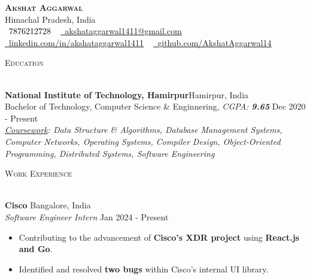 \documentclass[a4paper]{article}
\newcommand{\bulletSep} { \vspace{2mm} }
\newcommand{\sectionSep} { \vspace{3mm} }
\newcommand{\lineunder} {
    \vspace*{-8pt} \\
    \hspace*{-15pt} \hrulefill \\
}
\newcommand{\header} [1] {
    {\hspace*{-18pt}\vspace*{6pt} {
        \fontfamily{qcs}\selectfont \large \scshape #1
    }}
    \vspace*{-6pt} \lineunder
    \vspace{1.1mm}
}
\newcommand{\educationItem}[6]{
    \textbf{#1}\hfill #2\\
    #3, \textit{#4} \hfill #5\\
    #6
}
\newcommand{\experienceItem}[5]{
    \textbf{#1} \hfill #2 \\
    \textit{#3} \hfill #4 \\
    #5
}
\newcommand{\link}[2]{
    {\fontfamily{lmtt}\selectfont\href{#1}{#2}}
}
\begin{document}

\begin{center}
    {\textbf{\Huge \scshape Akshat Aggarwal}} \\ \vspace{1pt}
    Himachal Pradesh, India \\
    \small \textcolor{black}{\raisebox{-0.1\height}\faPhone\
        7876212728} ~ \href{mailto:akshataggarwal1411@gmail.com}{{\raisebox{-0.2\height}\faEnvelope\  \underline{akshataggarwal1411@gmail.com}}} ~
    \href{https://www.linkedin.com/in/akshataggarwal1411/}{{\raisebox{-0.2\height}\faLinkedinSquare\ \underline{linkedin.com/in/akshataggarwal1411}}}  ~
    \href{https://github.com/AkshatAggarwal14}{{\raisebox{-0.2\height}\faGithub\ \underline{github.com/AkshatAggarwal14}}}
\end{center}

\vspace{-2mm}

\hypersetup {
    urlcolor     = blue, %
}


\header{Education}

\educationItem{National Institute of Technology, Hamirpur}{Hamirpur, India}{Bachelor of Technology, Computer Science \& Enginnering}{CGPA: \textbf{9.65}}{Dec 2020 - Present}{
    \vspace{2mm}
    \textit{\underline{Coursework}: Data Structure \& Algorithms, Database Management Systems, Computer Networks, Operating Systems, Compiler Design, Object-Oriented Programming, Distributed Systems, Software Engineering}

}


\sectionSep


\header{Work Experience}

\experienceItem{Cisco}{Bangalore, India}{Software Engineer Intern}{Jan 2024 - Present}{
    \begin{itemize}
        \item Contributing to the advancement of \textbf{Cisco's XDR project} using \textbf{React.js and Go}.
        \item Identified and resolved \textbf{two bugs} within Cisco's internal UI library.
    \end{itemize}
}
\bulletSep
\end{document}
